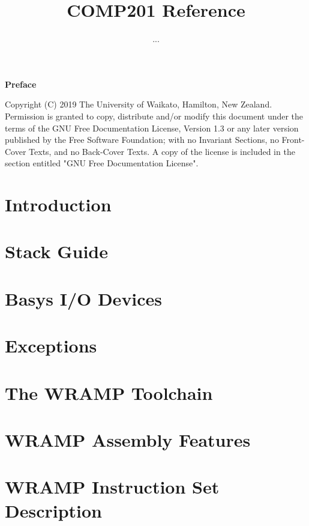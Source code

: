 \documentclass[a4paper]{book}
\title{COMP201 Reference}
\author{...}
\begin{document}

\begin{Huge}
\vspace{2cm}
\textbf{Preface}\\
\vspace{1.5cm}
\end{Huge}




Copyright (C) 2019 The University of Waikato, Hamilton, New Zealand.
Permission is granted to copy, distribute and/or modify this document
under the terms of the GNU Free Documentation License, Version 1.3
or any later version published by the Free Software Foundation;
with no Invariant Sections, no Front-Cover Texts, and no Back-Cover Texts.
A copy of the license is included in the section entitled "GNU
Free Documentation License".

\tableofcontents

\chapter{Introduction}
\label{chapter:intro}

\chapter{Stack Guide}
\label{chapter:stack}

\chapter{Basys I/O Devices}
\label{chapter:io}

\chapter{Exceptions}
\label{chapter:exceptions}

\appendix
\chapter{The WRAMP Toolchain}
\label{appendix:wasm-wlink}

\chapter{WRAMP Assembly Features}
\label{appendix:wramp-assembly}
\chapter{WRAMP Instruction Set Description}
\label{appendix:instr}

\end{document}
